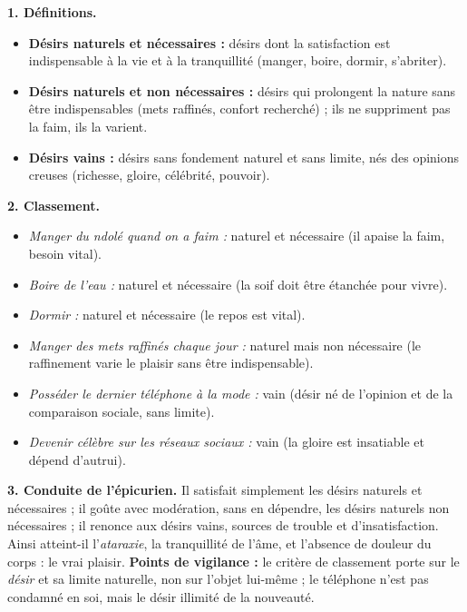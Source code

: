 \documentclass[11pt]{article}
\begin{document}
\begin{corrige}
\textbf{1. Définitions.}
\begin{itemize}
\item \textbf{Désirs naturels et nécessaires :} désirs dont la satisfaction est indispensable à la vie et à la tranquillité (manger, boire, dormir, s'abriter).
\item \textbf{Désirs naturels et non nécessaires :} désirs qui prolongent la nature sans être indispensables (mets raffinés, confort recherché) ; ils ne suppriment pas la faim, ils la varient.
\item \textbf{Désirs vains :} désirs sans fondement naturel et sans limite, nés des opinions creuses (richesse, gloire, célébrité, pouvoir).
\end{itemize}
\textbf{2. Classement.}
\begin{itemize}
\item \emph{Manger du ndolé quand on a faim :} naturel et nécessaire (il apaise la faim, besoin vital).
\item \emph{Boire de l'eau :} naturel et nécessaire (la soif doit être étanchée pour vivre).
\item \emph{Dormir :} naturel et nécessaire (le repos est vital).
\item \emph{Manger des mets raffinés chaque jour :} naturel mais non nécessaire (le raffinement varie le plaisir sans être indispensable).
\item \emph{Posséder le dernier téléphone à la mode :} vain (désir né de l'opinion et de la comparaison sociale, sans limite).
\item \emph{Devenir célèbre sur les réseaux sociaux :} vain (la gloire est insatiable et dépend d'autrui).
\end{itemize}
\textbf{3. Conduite de l'épicurien.} Il satisfait simplement les désirs naturels et nécessaires ; il goûte avec modération, sans en dépendre, les désirs naturels non nécessaires ; il renonce aux désirs vains, sources de trouble et d'insatisfaction. Ainsi atteint-il l'\emph{ataraxie}, la tranquillité de l'âme, et l'absence de douleur du corps : le vrai plaisir.
\textbf{Points de vigilance :} le critère de classement porte sur le \emph{désir} et sa limite naturelle, non sur l'objet lui-même ; le téléphone n'est pas condamné en soi, mais le désir illimité de la nouveauté.
\end{corrige}
\end{document}
